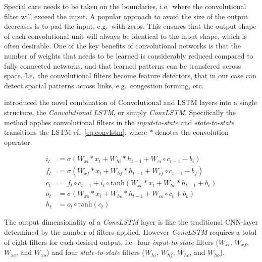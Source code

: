 \documentclass[preprint,11pt,5p,twocolumn]{elsarticle}
\begin{document}
Special care needs to be taken on the boundaries, i.e.\ where the convolutional filter will exceed the input. A popular approach to avoid the size of the output decreases is to pad the input, e.g.\ with zeros. This ensures that the output shape of each convolutional unit will always be identical to the input shape, which is often desirable. One of the key benefits of convolutional networks is that the number of weights that needs to be learned is considerably reduced compared to fully connected networks, and that learned patterns can be transfered across space. I.e.\ the convolutional filters become feature detectors, that in our case can detect spacial patterns across links, e.g.\ congestion forming, etc.   

\citet{ConvLSTM} introduced the novel combination of Convolutional and LSTM layers into a single structure, the \emph{Convolutional LSTM}, or simply \emph{ConvLSTM}. Specifically the method applies convolutional filters in the \emph{input-to-state} and \emph{state-to-state} transitions the LSTM cf.~\cref{eq:convlstm}, where $*$ denotes the convolution operator.

\begin{equation}
\begin{aligned}
  i_t &= \sigma \left( W_\mathit{xi} * x_t + W_\mathit{hi} * h_{t-1} + W_{ci} \circ c_{t-1} + b_i \right) \\
  f_t &= \sigma \left( W_\mathit{xf} * x_t + W_\mathit{hf} * h_{t-1} + W_\mathit{cf} \circ c_{t-1} + b_f \right) \\
  c_t &= f_t \circ c_{t-1} + i_t \circ \mathrm{tanh} \left( W_\mathit{xc} * x_t + W_\mathit{hc} * h_{t-1} + b_c \right) \\
  o_t &= \sigma \left( W_\mathit{xo} * x_t + W_\mathit{ho} * h_{t-1} + W_\mathit{co} \circ c_{t} + b_o \right) \\
  h_t &= o_t \circ \mathrm{tanh} \left( c_t \right)
\end{aligned}
\label{eq:convlstm}
\end{equation}
\vspace{.5em}

The output dimensionality of a \emph{ConvLSTM} layer is like the traditional CNN-layer determined by the number of filters applied. However \emph{ConvLSTM} requires a total of eight filters for each desired output, i.e.\ four \emph{input-to-state} filters ($W_\mathit{xi}$, $W_\mathit{xf}$, $W_\mathit{xc}$, and $W_\mathit{xo}$) and four \emph{state-to-state} filters ($W_\mathit{hi}$, $W_\mathit{hf}$, $W_\mathit{hc}$, and $W_\mathit{ho}$).
\end{document}
